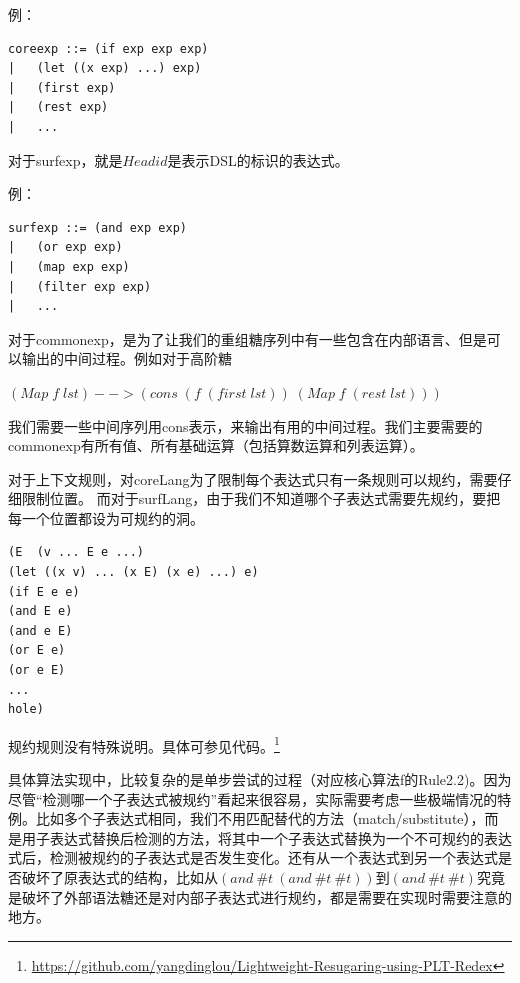 例：
\begin{verbatim}
coreexp ::= (if exp exp exp)
|   (let ((x exp) ...) exp)
|   (first exp)
|   (rest exp)
|   ...
\end{verbatim}

对于surfexp，就是$Headid$是表示DSL的标识的表达式。

例：
\begin{verbatim}
surfexp ::= (and exp exp)
|   (or exp exp)
|   (map exp exp)
|   (filter exp exp)
|   ...
\end{verbatim}

对于commonexp，是为了让我们的重组糖序列中有一些包含在内部语言、但是可以输出的中间过程。例如对于高阶糖

$(Map\;f\;lst)-->(cons\;(f\;(first\;lst))\;(Map\;f\;(rest\;lst)))$

\begin{flushleft}
	我们需要一些中间序列用cons表示，来输出有用的中间过程。我们主要需要的commonexp有所有值、所有基础运算（包括算数运算和列表运算）。
\end{flushleft}

对于上下文规则，对coreLang为了限制每个表达式只有一条规则可以规约，需要仔细限制位置。
而对于surfLang，由于我们不知道哪个子表达式需要先规约，要把每一个位置都设为可规约的洞。
\begin{verbatim}
(E  (v ... E e ...)
(let ((x v) ... (x E) (x e) ...) e)
(if E e e)
(and E e)
(and e E)
(or E e)
(or e E)
...
hole)
\end{verbatim}

规约规则没有特殊说明。具体可参见代码。\footnote{\url{https://github.com/yangdinglou/Lightweight-Resugaring-using-PLT-Redex}}

具体算法实现中，比较复杂的是单步尝试的过程（对应核心算法f的Rule2.2)。因为尽管“检测哪一个子表达式被规约”看起来很容易，实际需要考虑一些极端情况的特例。比如多个子表达式相同，我们不用匹配替代的方法（match/substitute），而是用子表达式替换后检测的方法，将其中一个子表达式替换为一个不可规约的表达式后，检测被规约的子表达式是否发生变化。还有从一个表达式到另一个表达式是否破坏了原表达式的结构，比如从$(and~\#t~(and~\#t~\#t))$到$(and~\#t~\#t)$究竟是破坏了外部语法糖还是对内部子表达式进行规约，都是需要在实现时需要注意的地方。